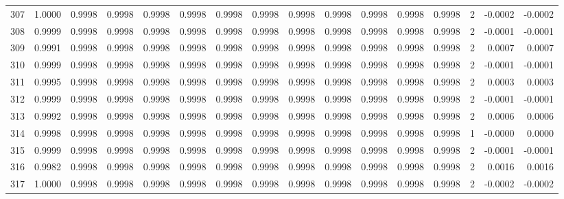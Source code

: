 \begin{tabular}{lrrrrrrrrrrrrrrr}
307 &      1.0000 &  0.9998 &  0.9998 &  0.9998 &  0.9998 &  0.9998 &  0.9998 &  0.9998 &  0.9998 &  0.9998 &   0.9998 &     0.9998 &      2 &                   -0.0002 &                    -0.0002 \\
308 &      0.9999 &  0.9998 &  0.9998 &  0.9998 &  0.9998 &  0.9998 &  0.9998 &  0.9998 &  0.9998 &  0.9998 &   0.9998 &     0.9998 &      2 &                   -0.0001 &                    -0.0001 \\
309 &      0.9991 &  0.9998 &  0.9998 &  0.9998 &  0.9998 &  0.9998 &  0.9998 &  0.9998 &  0.9998 &  0.9998 &   0.9998 &     0.9998 &      2 &                    0.0007 &                     0.0007 \\
310 &      0.9999 &  0.9998 &  0.9998 &  0.9998 &  0.9998 &  0.9998 &  0.9998 &  0.9998 &  0.9998 &  0.9998 &   0.9998 &     0.9998 &      2 &                   -0.0001 &                    -0.0001 \\
311 &      0.9995 &  0.9998 &  0.9998 &  0.9998 &  0.9998 &  0.9998 &  0.9998 &  0.9998 &  0.9998 &  0.9998 &   0.9998 &     0.9998 &      2 &                    0.0003 &                     0.0003 \\
312 &      0.9999 &  0.9998 &  0.9998 &  0.9998 &  0.9998 &  0.9998 &  0.9998 &  0.9998 &  0.9998 &  0.9998 &   0.9998 &     0.9998 &      2 &                   -0.0001 &                    -0.0001 \\
313 &      0.9992 &  0.9998 &  0.9998 &  0.9998 &  0.9998 &  0.9998 &  0.9998 &  0.9998 &  0.9998 &  0.9998 &   0.9998 &     0.9998 &      2 &                    0.0006 &                     0.0006 \\
314 &      0.9998 &  0.9998 &  0.9998 &  0.9998 &  0.9998 &  0.9998 &  0.9998 &  0.9998 &  0.9998 &  0.9998 &   0.9998 &     0.9998 &      1 &                   -0.0000 &                     0.0000 \\
315 &      0.9999 &  0.9998 &  0.9998 &  0.9998 &  0.9998 &  0.9998 &  0.9998 &  0.9998 &  0.9998 &  0.9998 &   0.9998 &     0.9998 &      2 &                   -0.0001 &                    -0.0001 \\
316 &      0.9982 &  0.9998 &  0.9998 &  0.9998 &  0.9998 &  0.9998 &  0.9998 &  0.9998 &  0.9998 &  0.9998 &   0.9998 &     0.9998 &      2 &                    0.0016 &                     0.0016 \\
317 &      1.0000 &  0.9998 &  0.9998 &  0.9998 &  0.9998 &  0.9998 &  0.9998 &  0.9998 &  0.9998 &  0.9998 &   0.9998 &     0.9998 &      2 &                   -0.0002 &                    -0.0002 \\

\end{tabular}
